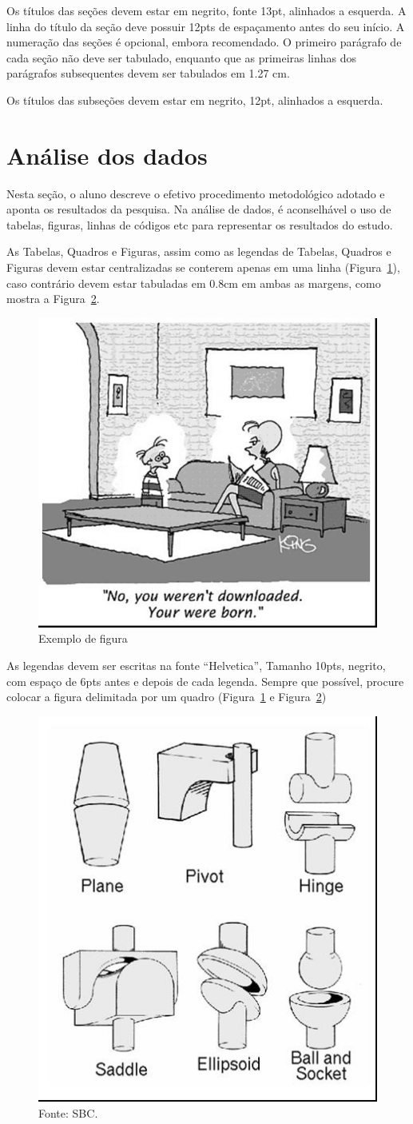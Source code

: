 \documentclass[12pt]{article}
\begin{document}
Os títulos das seções devem estar em negrito, fonte 13pt, alinhados a esquerda. A linha do título da seção deve possuir 12pts de espaçamento antes do seu início. A numeração das seções é opcional, embora recomendado. O primeiro parágrafo de cada seção não deve ser tabulado, enquanto que as primeiras linhas dos parágrafos subsequentes devem ser tabulados em 1.27 cm.

Os títulos das subseções devem estar em negrito, 12pt, alinhados a esquerda.


\section{Análise dos dados}\label{sec:analisedosdados}

Nesta seção, o aluno descreve o efetivo procedimento metodológico adotado e aponta os resultados da pesquisa. Na análise de dados, é  aconselhável o uso de tabelas, figuras, linhas de códigos etc para representar os resultados do estudo.

As Tabelas, Quadros e Figuras, assim como as legendas de Tabelas, Quadros e Figuras devem estar centralizadas se conterem apenas em uma linha (Figura~\ref{fig:figura1}), caso contrário devem estar tabuladas em 0.8cm em ambas as margens, como mostra a Figura~\ref{fig:figura2}. 

\begin{figure}[ht]
\centering
\includegraphics[width=.3\textwidth]{fig1.jpg}
\caption{Exemplo de figura}
\label{fig:figura1}
\end{figure}

As legendas devem ser escritas na fonte “Helvetica”, Tamanho 10pts, negrito, com espaço de 6pts antes e depois de cada legenda. Sempre que possível, procure colocar a figura delimitada por um quadro (Figura~\ref{fig:figura1} e Figura~\ref{fig:figura2})

\begin{figure}[!ht]
\centering
\includegraphics[width=.2\textwidth]{fig2.jpg}
\caption{Essa figura foi referenciada na Seção~\ref{sec:analisedosdados}.}
\caption{Fonte: SBC.}
\label{fig:figura2}
\end{figure}
\end{document}
